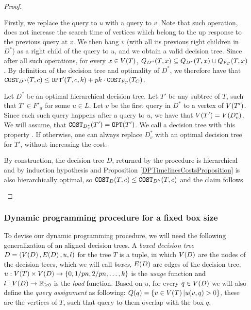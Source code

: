 \begin{lemma}
\begin{proof}
\begin{enumerate}
        Firstly, we replace the query to $u$ with a query to $v$. Note that such operation, does not increase the search time of vertices which belong to the up response to the previous query at $v$. We then hang $v$ (with all its previous right children in $D^*$) as a right child of the query to $u$, and we obtain a valid decision tree. Since after all such operations, for every $x\in V\mathopen{}\left( T \right)$, $Q_{D''}\mathopen{}\left( T,x \right)\subseteq Q_{D^*}\mathopen{}\left( T,x \right)\cup Q_{F_C}\mathopen{}\left( T,x \right)$. By definition of the decision tree and optimality of $D^*$, we therefore have that $\texttt{COST}_{D''}\mathopen{}\left( T,c \right)\leq\texttt{OPT}'\mathopen{}\left( T,c, k \right) + pk\cdot \texttt{COST}_{F_C}\mathopen{}\left( T_C \right)$. 
        
        Let $D^*$ be an optimal hierarchical decision tree. Let $T'$ be any subtree of $T$, such that $T'\in F'_u$ for some $u\in L$. Let $v$ be the first query in $D^*$ to a vertex of $V\mathopen{}\left( T' \right)$. Since each such query happens after a query to $u$, we have that $V\mathopen{}\left( T' \right)=V\mathopen{}\left( D_{v}^* \right)$. We will assume, that $\texttt{COST}_{D_{v}^*}\mathopen{}\left( T' \right)= \texttt{OPT}\mathopen{}\left( T' \right)$. We call a decision tree with this property . If otherwise, one can always replace $D_{v}^*$ with an optimal decision tree for $T'$, without increasing the cost.

        By construction, the decision tree $D$, returned by the procedure is hierarchical and by induction hypothesis and Proposition \ref{DPTimelinesCostsProposition} is also hierarchically optimal, so $\texttt{COST}_{D}\mathopen{}\left( T,c \right)\leq \texttt{COST}_{D''}\mathopen{}\left( T,c \right)$ and the claim follows.

    \end{enumerate}
\end{proof}
\end{lemma}


\subsubsection{Dynamic programming procedure for a fixed box size}



To devise our dynamic programming procedure, we will need the following generalization of an aligned decision trees. A \textit{boxed decision tree} $D=\mathopen{}\left( V\mathopen{}\left( D \right), E\mathopen{}\left( D \right), u, l \right)$ for the tree $T$ is a tuple, in which $V\mathopen{}\left( D \right)$ are the nodes of the decision trees, which we will call \textit{boxes}, $E\mathopen{}\left( D \right)$ are edges of the decision tree, $u:V\mathopen{}\left( T \right)\times V\mathopen{}\left( D \right)\to \mathopen{}\left\{ 0, 1/pn,2/pn,\dots,k \right\}$ is the \textit{usage} function and $l:V\mathopen{}\left( D \right)\to\mathbb{R}_{\geq 0}$ is the \textit{load} function. Based on $u$, for every $q\in V\mathopen{}\left( D \right)$ we will also define the \textit{query assignment} as following: $Q\mathopen{}\left( q \right)=\mathopen{}\left\{ v\in V\mathopen{}\left( T \right)|u\mathopen{}\left( v,q \right)>0 \right\}$, these are the vertices of $T$, such that query to them overlap with the box $q$.

